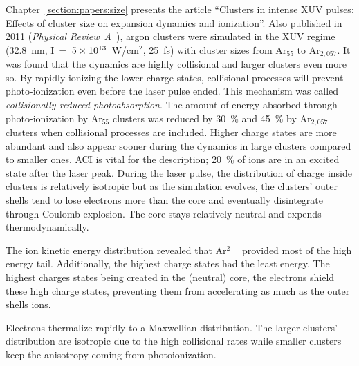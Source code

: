 Chapter~\ref{section:papers:size} presents the article ``Clusters in
intense XUV pulses: Effects of cluster size on expansion dynamics and
ionization''. Also published in 2011 (\textit{Physical Review~A}~\cite{Ackad2011b}),
argon clusters were simulated in the XUV regime (32.8~nm,
I~=~$\ten{5}{13}$~W/cm$^{2}$, 25~fs) with cluster sizes from Ar$_{55}$ to
Ar$_{2,057}$. It was found that the dynamics are highly collisional and
larger clusters even more so. By rapidly ionizing the lower charge states,
collisional processes will prevent photo-ionization even before the laser pulse
ended. This mechanism was called \textit{collisionally reduced photoabsorption}.
The amount of energy absorbed through photo-ionization by Ar$_{55}$ clusters was
reduced by 30~\% and 45~\% by Ar$_{2,057}$ clusters when collisional processes
are included.
Higher charge states are more abundant and also appear sooner during the
dynamics in large clusters compared to smaller ones. ACI is vital for the
description; 20~\% of ions are in an excited state after the laser peak.
During the laser pulse, the distribution of charge inside clusters is
relatively isotropic but as the simulation evolves, the clusters' outer shells tend to
lose electrons more than the core and eventually disintegrate through Coulomb
explosion.
The core stays relatively neutral and expends thermodynamically.

The ion kinetic energy distribution revealed that Ar$^{2+}$  provided most of
the high energy tail. Additionally, the highest charge states had the least
energy. The highest charges states being created in the (neutral) core, the
electrons shield these high charge states, preventing them from accelerating
as much as the outer shells ions.

Electrons thermalize rapidly to a Maxwellian distribution. The larger clusters'
distribution are isotropic due to the high collisional rates while smaller
clusters keep the anisotropy coming from photoionization.




